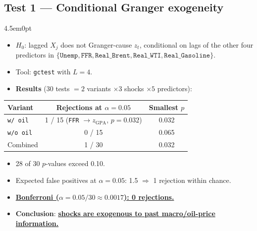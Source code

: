 \documentclass[12pt]{article}
\newenvironment{bodyL3}{\begin{adjustwidth}{4.5em}{0pt}}{\end{adjustwidth}}
\begin{document}
\subsection{Test 1 --- Conditional Granger exogeneity}
\begin{bodyL3}
\begin{itemize}
    \item $H_0$: lagged $X_j$ does not Granger-cause $z_t$, conditional on lags of the
    other four predictors in $\{\texttt{Unemp}, \texttt{FFR}, \texttt{Real\_Brent}, \texttt{Real\_WTI}, \texttt{Real\_Gasoline}\}$.
    \item Tool: \texttt{gctest} with $L = 4$.
    \item \textbf{Results} (30 tests $= 2$ variants $\times 3$ shocks $\times 5$ predictors):
\end{itemize}

\begin{center}
\renewcommand{\arraystretch}{1.15}
\begin{tabular}{lcc}
\toprule
Variant      & Rejections at $\alpha = 0.05$ & Smallest $p$ \\
\midrule
\texttt{w/ oil}    & 1 / 15 (\texttt{FFR} $\to z_{\text{GPA}}$, $p = 0.032$) & 0.032 \\
\texttt{w/o oil} & 0 / 15                                                  & 0.065 \\
\midrule
Combined         & 1 / 30                                                  & 0.032 \\
\bottomrule
\end{tabular}
\end{center}

\smallskip
\begin{itemize}
    \item[--] 28 of 30 $p$-values exceed 0.10.
    \item[--] Expected false positives at $\alpha = 0.05$: 1.5 $\Rightarrow$ 1 rejection within chance.
    \item[--] \underline{\textbf{Bonferroni ($\alpha = 0.05/30 \approx 0.0017$): 0 rejections.}}
    \item[--] \textbf{Conclusion}: \underline{\textbf{shocks are exogenous to past macro/oil-price information.}}
\end{itemize}
\end{bodyL3}
\end{document}
